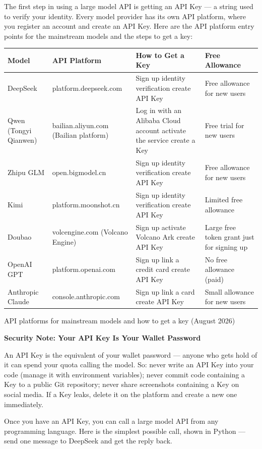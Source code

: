 The first step in using a large model API is getting an API Key — a string used to verify your identity. Every model provider has its own API platform, where you register an account and create an API Key. Here are the API platform entry points for the mainstream models and the steps to get a key:

\begin{center}
\begin{tabularx}{\linewidth}{|X|X|X|X|}
\hline
\textbf{Model} & \textbf{API Platform} & \textbf{How to Get a Key} & \textbf{Free Allowance} \tabularnewline
\hline
DeepSeek & platform.deepseek.com & Sign up identity verification create API Key & Free allowance for new users \tabularnewline
Qwen (Tongyi Qianwen) & bailian.aliyun.com (Bailian platform) & Log in with an Alibaba Cloud account activate the service create a Key & Free trial for new users \tabularnewline
Zhipu GLM & open.bigmodel.cn & Sign up identity verification create API Key & Free allowance for new users \tabularnewline
Kimi & platform.moonshot.cn & Sign up identity verification create API Key & Limited free allowance \tabularnewline
Doubao & volcengine.com (Volcano Engine) & Sign up activate Volcano Ark create API Key & Large free token grant just for signing up \tabularnewline
OpenAI GPT & platform.openai.com & Sign up link a credit card create API Key & No free allowance (paid) \tabularnewline
Anthropic Claude & console.anthropic.com & Sign up link a card create API Key & Small allowance for new users \tabularnewline
\hline
\end{tabularx}
\end{center}

\begin{center}\small\color{gray}API platforms for mainstream models and how to get a key (August 2026)\end{center}

\textbf{Security Note: Your API Key Is Your Wallet Password}\par

An API Key is the equivalent of your wallet password — anyone who gets hold of it can spend your quota calling the model. So: never write an API Key into your code (manage it with environment variables); never commit code containing a Key to a public Git repository; never share screenshots containing a Key on social media. If a Key leaks, delete it on the platform and create a new one immediately.


Once you have an API Key, you can call a large model API from any programming language. Here is the simplest possible call, shown in Python — send one message to DeepSeek and get the reply back.

